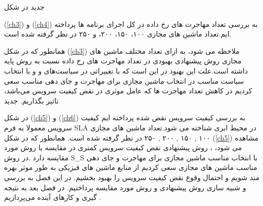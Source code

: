 ‌جدید 
در شکل
	
		
(\ref{ch3})
و
(\ref{ch4})
به بررسی تعداد مهاجرت های رخ داده در کل اجرای برنامه ها  پرداخته ایم.تعداد ماشین های مجازی ۱۰۰، ۱۵۰، ۲۰۰، و ۲۵۰ در نظر گرفته شده است. 

همانطور که در شکل 
(\ref{ch3})
 ملاحظه می شود، به ازای تعداد مختلف ماشین های مجازی روش پیشنهادی بهبودی در تعداد مهاجرت های رخ داده نسبت به روش پایه داشته است.علت این بهبود در این است که با تغییراتی در سیاست‌های 
 و
 و با
  انتخاب سیاست مناسب در انتخاب ماشین مجازی برای مهاجرت و جای دهی مناسب سعی کردیم در کاهش تعداد مهاجرت ها که عامل موثری در نقض کیفیت سرویس می‌باشد، تاثیر بگذاریم.
‌جدید


 در شکل
(\ref{ch5})
و
(\ref{ch6})
 به بررسی کیفیت سرویس نقض شده پرداخته ایم کیفیت سرویس معمولا به فرم  SLA در محیط ابری شناخته می شود.تعداد ماشین های مجازی
۱۰۰
,
۱۵۰
,
۲۰۰
,
۲۵۰
  در نظر گرفته شده است.
همانطور که در شکل  
(\ref{ch5})
مشاهده می شود، ­، روش پیشنهادی نقض کیفیت سرویس کمتری در مقایسه با روش مورد مقایسه دارد .در روش S\_S با انتخاب مناسب ماشین مجازی برای مهاجرت و جای دهی مناسب ماشین های مجازی سعی کردیم از منابع ماشین های فیزیکی به طور موثر بهره مند شویم و احتمال وقوع نقض کیفیت سرویس  را بهبود بخشیم. 
در این فصل به بررسی و شبیه سازی روش پیشنهادی  و روش مورد مقایسه پرداختیم. در فصل بعد به نتیجه گیری  و کارهای آینده می‌پردازیم .
